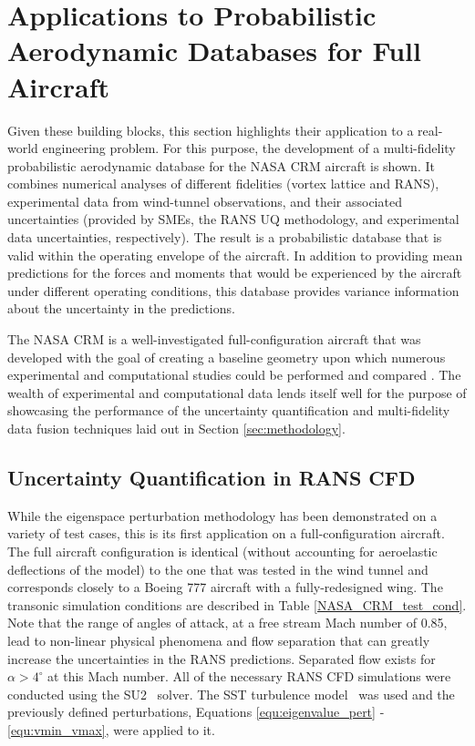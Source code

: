 \chapter{Applications to Probabilistic Aerodynamic Databases for Full Aircraft} \label{sec:results}

Given these building blocks, this section highlights their application to a real-world engineering problem. For this purpose, the development of a multi-fidelity probabilistic aerodynamic database for the NASA CRM aircraft is shown. It combines numerical analyses of different fidelities (vortex lattice and RANS), experimental data from wind-tunnel observations, and their associated uncertainties (provided by SMEs, the RANS UQ methodology, and experimental data uncertainties, respectively). The result is a probabilistic database that is valid within the operating envelope of the aircraft. In addition to providing mean predictions for the forces and moments that would be experienced by the aircraft under different operating conditions, this database provides variance information about the uncertainty in the predictions. 

The NASA CRM is a well-investigated full-configuration aircraft \cite{rivers_further_2012,rivers_experimental_2010} that was developed with the goal of creating a baseline geometry upon which numerous experimental and computational studies could be performed and compared \cite{morrison20094th,levy2013summary,morrison20166th,roy2017summary,tinoco2017summary}. The wealth of experimental and computational data lends itself well for the purpose of showcasing the performance of the uncertainty quantification and multi-fidelity data fusion techniques laid out in Section \ref{sec:methodology}. 

\section{Uncertainty Quantification in RANS CFD} \label{sec:crm_uq}
While the eigenspace perturbation methodology has been demonstrated on a variety of test cases, this is its first application on a full-configuration aircraft. The full aircraft configuration is identical (without accounting for aeroelastic deflections of the model) to the one that was tested in the wind tunnel and corresponds closely to a Boeing 777 aircraft with a fully-redesigned wing. The transonic simulation conditions are described in Table \ref{NASA_CRM_test_cond}. Note that the range of angles of attack, at a free stream Mach number of 0.85, lead to non-linear physical phenomena and flow separation that can greatly increase the uncertainties in the RANS predictions. Separated flow exists for $\alpha > 4^\circ$ at this Mach number. All of the necessary RANS CFD simulations were conducted using the SU2~\cite{su2_aiaajournal} solver. The SST turbulence model~\cite{menter1994two,menter2003ten} was used and the previously defined perturbations, Equations \eqref{equ:eigenvalue_pert} - \eqref{equ:vmin_vmax}, were applied to it. 

